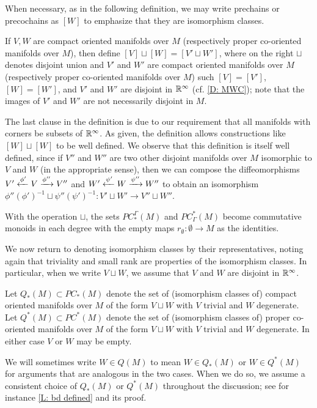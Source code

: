 When necessary, as in the following definition, we may write prechains or precochains as $[W]$ to emphasize that they are isomorphism classes.

\begin{definition}\label{D: prechain sum}
	If $V,W$ are compact oriented manifolds over $M$ (respectively proper co-oriented manifolds over $M$), then define $[V] \sqcup [W] = [V' \sqcup W']$, where on the right $\sqcup$ denotes disjoint union and $V'$ and $W'$ are compact oriented manifolds over $M$ (respectively proper co-oriented manifolds over $M$) such $[V]=[V']$, $[W]=[W']$, and $V'$ and $W'$ are disjoint in $\mathbb{R}^\infty$ (cf.
	\cref{D: MWC}); note that the images of $V'$ and $W'$ are not necessarily disjoint in $M$.
\end{definition}

The last clause in the definition is due to our requirement that all manifolds with corners be subsets of $\mathbb{R}^\infty$.
As given, the definition allows constructions like $[W]\sqcup[W]$ to be well defined.
We observe that this definition is itself well defined, since if $V''$ and $W''$ are two other disjoint manifolds over $M$ isomorphic to $V$ and $W$ (in the appropriate sense), then we can compose the diffeomorphisms $V'\xleftarrow{\phi'}V \xrightarrow{\phi''} V''$ and $W'\xleftarrow{\psi'}W \xrightarrow{\psi''} W''$ to obtain an isomorphism $\phi''(\phi')^{-1} \sqcup \psi''(\psi')^{-1} \colon V' \sqcup W' \to V'' \sqcup W''$.

With the operation $\sqcup$, the sets $PC^\Gamma_*(M)$ and $PC_\Gamma^*(M)$ become commutative monoids in each degree with the empty maps $r_\emptyset \colon \emptyset \to M$ as the identities.

We now return to denoting isomorphism classes by their representatives, noting again that triviality and small rank are properties of the isomorphism classes.
In particular, when we write $V \sqcup W$, we assume that $V$ and $W$ are disjoint in $\mathbb{R}^\infty$.

\begin{definition}\label{D: Q}
	Let $Q_*(M) \subset PC_*(M)$ denote the set of (isomorphism classes of) compact oriented manifolds over $M$ of the form $V \sqcup W$ with $V$ trivial and $W$ degenerate.
	Let $Q^*(M) \subset PC^*(M)$ denote the set of (isomorphism classes of) proper co-oriented manifolds over $M$ of the form $V \sqcup W$ with $V$ trivial and $W$ degenerate.
	In either case $V$ or $W$ may be empty.

	We will sometimes write $W \in Q(M)$ to mean $W \in Q_*(M)$ or $W \in Q^*(M)$ for arguments that are analogous in the two cases.
	When we do so, we assume a consistent choice of $Q_*(M)$ or $Q^*(M)$ throughout the discussion; see for instance \cref{L: bd defined} and its proof.
\end{definition}

